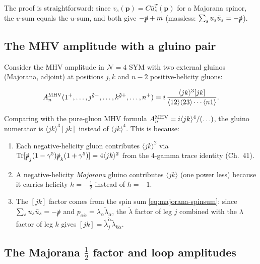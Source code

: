 The proof is straightforward: since $v_s(\mathbf{p}) = C\bar u_s^T(\mathbf{p})$
for a Majorana spinor, the $v$-sum equals the $u$-sum, and both give $-\slashed{p}+m$
(massless: $\sum_s u_s\bar u_s = -\slashed{p}$).

\subsection{The MHV amplitude with a gluino pair}

Consider the MHV amplitude in $\mathcal{N}=4$ SYM with two external gluinos
(Majorana, adjoint) at positions $j,k$ and $n-2$ positive-helicity gluons:

\begin{mdframed}[backgroundcolor=blue!5]
\begin{equation}\label{eq:mhv-gluino}
  A_n^{\rm MHV}(1^+,\ldots,j^{\tilde g-},\ldots,k^{\tilde g+},\ldots,n^+)
  = i\,\frac{\langle jk\rangle^3 [jk]}
            {\langle12\rangle\langle23\rangle\cdots\langle n1\rangle}.
\end{equation}
\end{mdframed}

Comparing with the pure-gluon MHV formula $A_n^{\rm MHV} = i\langle jk\rangle^4/(\ldots)$,
the gluino numerator is $\langle jk\rangle^3[jk]$ instead of $\langle jk\rangle^4$.
This is because:
\begin{enumerate}
  \item Each negative-helicity gluon contributes $\langle jk\rangle^2$ via
        $\operatorname{Tr}[\slashed{p}_j(1-\gamma^5)\slashed{p}_k(1+\gamma^5)] = 4\langle jk\rangle^2$
        from the 4-gamma trace identity (Ch.~41).
  \item A negative-helicity \emph{Majorana} gluino contributes $\langle jk\rangle$
        (one power less) because it carries helicity $h=-\tfrac12$ instead of $h=-1$.
  \item The $[jk]$ factor comes from the spin sum \eqref{eq:majorana-spinsum}: since
        $\sum_s u_s\bar u_s = -\slashed{p}$ and $p_{\alpha\dot\alpha} = \lambda_\alpha\tilde\lambda_{\dot\alpha}$,
        the $\tilde\lambda$ factor of leg $j$ combined with the $\lambda$ factor of leg $k$
        gives $[jk] = \tilde\lambda_j^{\dot\alpha}\tilde\lambda_{k\dot\alpha}$.
\end{enumerate}

\subsection{The Majorana $\tfrac{1}{2}$ factor and loop amplitudes}


